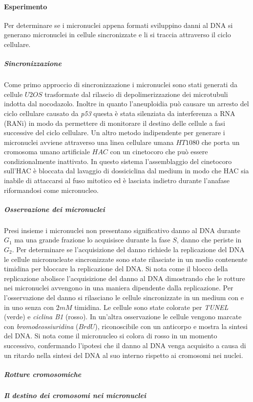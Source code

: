 \paragraph{Esperimento}
Per determinare se i micronuclei appena formati sviluppino danni al DNA si generano micronuclei in cellule sincronizzate e li si traccia attraverso il ciclo cellulare. 
\subparagraph{Sincronizzazione} 
Come primo approccio di sincronizzazione i micronuclei sono stati generati da cellule $U2OS$ trasformate dal rilascio di depolimerizzazione dei microtubuli indotta dal nocodazolo. 
Inoltre in quanto l'aneuploidia pu\`o causare un arresto del ciclo cellulare causato da \emph{p53} questa \`e stata silenziata da interferenza a RNA (RANi) in modo da permettere di 
monitorare il destino delle cellule a fasi successive del ciclo cellulare. Un altro metodo indipendente per generare i micronuclei avviene attraverso una linea cellulare umana $HT1080$ 
che porta un cromosoma umano artificiale $HAC$ con un cinetocoro che pu\`o essere condizionalmente inattivato. In questo sistema l'assemblaggio del cinetocoro sull'HAC \`e bloccata dal
lavaggio di dossiciclina dal medium in modo che HAC sia inabile di attaccarsi al fuso mitotico ed \`e lasciata indietro durante l'anafase riformandosi come micronucleo. 
\subparagraph{Osservazione dei micronuclei}
Presi insieme i micronuclei non presentano significativo danno al DNA durante $G_1$ ma una grande frazione lo acquisisce durante la fase $S$, danno che periste in $G_2$. Per determinare
se l'acquisizione del danno richiede la replicazione del DNA le cellule micronucleate sincronizzate sono state rilasciate in un medio contenente timidina per bloccare la replicazione del
DNA. Si nota come il blocco della replicazione abolisce l'acquisizione del danno al DNA dimostrando che le rotture nei micronuclei avvengono in una maniera dipendente dalla replicazione.
Per l'osservazione del danno si rilasciano le cellule sincronizzate in un medium con e in uno senza con $2mM$ timidina. Le cellule sono state colorate per \emph{TUNEL} (verde) e 
\emph{ciclina B1} (rosso). In un'altra osservazione le cellule vengono marcate con \emph{bromodeossiuridina} ($BrdU$), riconoscibile con un anticorpo e mostra la sintesi del DNA. Si
nota come il micronucleo si colora di rosso in un momento successivo, confermando l'ipotesi che il danno al DNA venga acquisito a causa di un ritardo nella sintesi del DNA al suo interno
rispetto ai cromosomi nei nuclei. 
\subparagraph{Rotture cromosomiche}

\subparagraph{Il destino dei cromosomi nei micronuclei}

